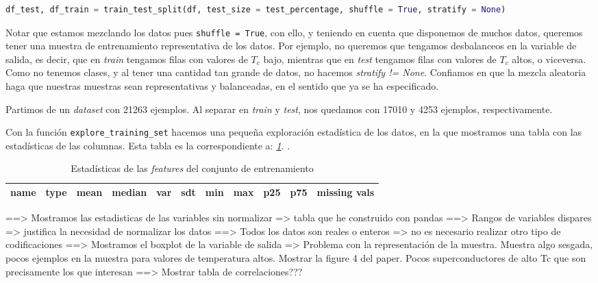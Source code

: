 \documentclass[11pt]{article}
\begin{document}
\begin{lstlisting}[language=Python]
    df_test, df_train = train_test_split(df, test_size = test_percentage, shuffle = True, stratify = None)
\end{lstlisting}

Notar que estamos mezclando los datos pues \lstinline{shuffle = True}, con ello, y teniendo en cuenta que disponemos de muchos datos, queremos tener una muestra de entrenamiento representativa de los datos. Por ejemplo, no queremos que tengamos desbalanceos en la variable de salida, es decir, que en \emph{train} tengamos filas con valores de $T_c$ bajo, mientras que en \emph{test} tengamos filas con valores de $T_c$ altos, o viceversa. Como no tenemos clases, y al tener una cantidad tan grande de datos, no hacemos \emph{stratify != None}. Confiamos en que la mezcla aleatoria haga que nuestras muestras sean representativas y balanceadas, en el sentido que ya se ha especificado.

Partimos de un \emph{dataset} con 21263 ejemplos. Al separar en \emph{train} y \emph{test}, nos quedamos con 17010 y 4253 ejemplos, respectivamente.

Con la función \lstinline{explore_training_set} hacemos una pequeña exploración estadística de los datos, en la que mostramos una tabla con las estadísticas de las columnas. Esta tabla es la correspondiente a: \emph{\ref{Tabla con los estadísticos de las features}. }.


\begin{table}
\begin{tabularx}{\textwidth}{|X|X|X|X|X|X|X|X|X|X|X|}
name& type& mean& median& var& sdt& min& max& p25& p75& missing vals \\
\hline
    \end{tabularx}
    \caption{Estadísticas de las \emph{features} del conjunto de entrenamiento}
    \label{Tabla con los estadísticos de las features}
\end{table}








==> Mostramos las estadisticas de las variables sin normalizar => tabla que he construido con pandas
==> Rangos de variables dispares => justifica la necesidad de normalizar los datos
==> Todos los datos son reales o enteros => no es necesario realizar otro tipo de codificaciones
==> Mostramos el boxplot de la variable de salida => Problema con la representación de la muestra. Muestra algo sesgada, pocos ejemplos en la muestra para valores de temperatura altos. Mostrar la figure 4 del paper. Pocos superconductores de alto Tc que son precisamente los que interesan
==> Mostrar tabla de correlaciones???
\end{document}
